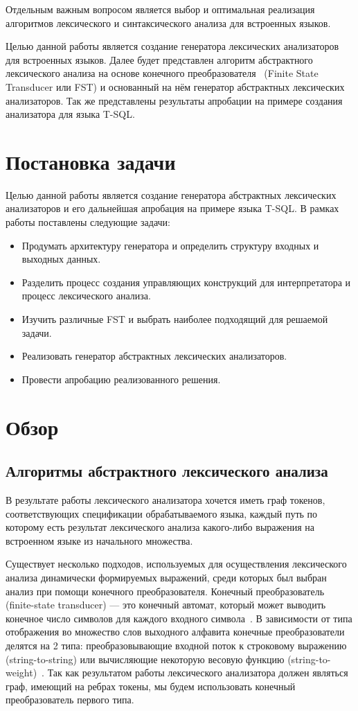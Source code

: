 Отдельным важным вопросом является выбор и оптимальная реализация алгоритмов 
лексического и синтаксического анализа для встроенных языков.

Целью данной работы является создание генератора лексических анализаторов для 
встроенных языков. Далее будет представлен алгоритм абстрактного лексического 
анализа на основе конечного преобразователя~\cite{FST} (Finite State Transducer или 
FST) и основанный на нём генератор абстрактных лексических анализаторов. 
Так же представлены результаты апробации на примере создания анализатора для 
языка T-SQL. 



\section{Постановка задачи}
Целью данной работы является создание генератора абстрактных лексических 
анализаторов и его дальнейшая апробация на примере языка T-SQL. В рамках работы 
поставлены следующие задачи: 
\begin{itemize}
    \item Продумать архитектуру генератора и определить структуру входных и 
    выходных данных.
    \item Разделить процесс создания управляющих конструкций для интерпретатора
    и процесс лексического анализа.
    \item Изучить различные FST и выбрать наиболее подходящий для решаемой 
    задачи.
    \item Реализовать генератор абстрактных лексических анализаторов.
    \item Провести апробацию реализованного решения.
\end{itemize}


\section{Обзор}
\subsection{Алгоритмы абстрактного лексического анализа}

В результате работы лексического анализатора хочется иметь граф токенов, 
соответствующих спецификации обрабатываемого языка, каждый путь по которому есть 
результат лексического анализа какого-либо выражения на встроенном языке из 
начального множества.

Существует несколько подходов, используемых для осуществления лексического 
анализа динамически формируемых выражений, среди которых был выбран анализ при 
помощи конечного преобразователя. Конечный преобразователь (finite-state 
transducer) — это конечный автомат, который может выводить конечное число 
символов для каждого входного символа~\cite{Martynenko}. В зависимости от типа 
отображения во множество слов выходного алфавита конечные преобразователи 
делятся на 2 типа: преобразовывающие входной поток к строковому выражению 
(string-to-string) или вычисляющие некоторую весовую функцию (string-to-weight)~\cite{FST}. 
Так как результатом работы лексического анализатора должен являться граф, 
имеющий на ребрах токены, мы будем использовать конечный преобразователь первого 
типа. 

